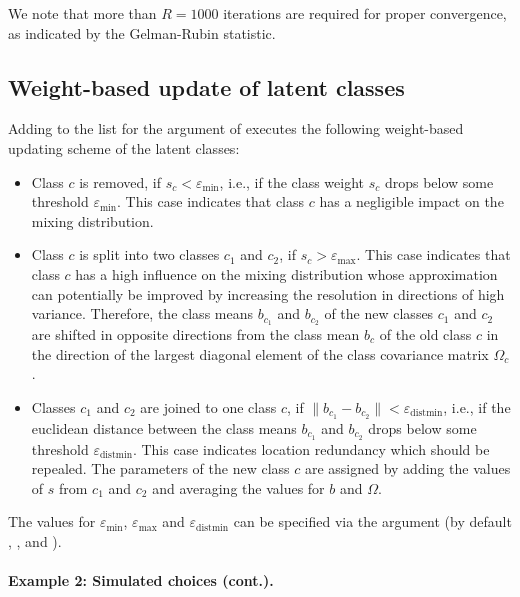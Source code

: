 \documentclass[article,shortnames]{jss}
\newcommand{\fct}[1]{\code{#1()}}
\begin{document}
We note that more than $R = 1000$ iterations are required for proper convergence, as indicated by the Gelman-Rubin statistic.

\subsection{Weight-based update of latent classes} \label{subsec:weight_update}

Adding  to the list for the  argument of \fct{fit\_model} executes the following weight-based updating scheme of the latent classes:

\begin{itemize}
  \item Class $c$ is removed, if $s_c<\varepsilon_{\text{min}}$, i.e., if the class weight $s_c$ drops below some threshold $\varepsilon_{\text{min}}$. This case indicates that class $c$ has a negligible impact on the mixing distribution.
  \item Class $c$ is split into two classes $c_1$ and $c_2$, if $s_c>\varepsilon_\text{max}$. This case indicates that class $c$ has a high influence on the mixing distribution whose approximation can potentially be improved by increasing the resolution in directions of high variance. Therefore, the class means $b_{c_1}$ and $b_{c_2}$ of the new classes $c_1$ and $c_2$ are shifted in opposite directions from the class mean $b_c$ of the old class $c$ in the direction of the largest diagonal element of the class covariance matrix $\Omega_c$.
  \item Classes $c_1$ and $c_2$ are joined to one class $c$, if $\lVert b_{c_1} - b_{c_2} \rVert<\varepsilon_{\text{distmin}}$, i.e., if the euclidean distance between the class means $b_{c_1}$ and $b_{c_2}$  drops below some threshold $\varepsilon_{\text{distmin}}$. This case indicates location redundancy which should be repealed. The parameters of the new class $c$ are assigned by adding the values of $s$ from $c_1$ and $c_2$ and averaging the values for $b$ and $\Omega$.
\end{itemize}

The values for $\varepsilon_{\text{min}}$, $\varepsilon_{\text{max}}$ and $\varepsilon_{\text{distmin}}$ can be specified via the  argument (by default , , and ).

\paragraph{Example 2: Simulated choices (cont.).}
\end{document}
